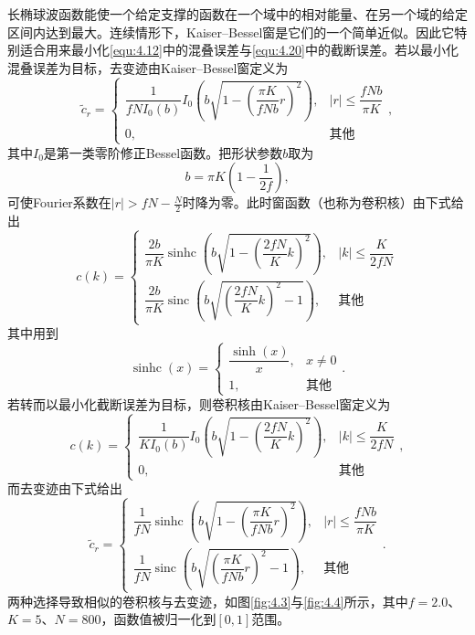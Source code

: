 \documentclass[12pt]{article}
\let\originallautoref\autoref
\renewcommand{\autoref}[1]{\allowbreak\originallautoref{#1}}
\begin{document}
长椭球波函数能使一个给定支撑的函数在一个域中的相对能量、在另一个域的给定区间内达到最大。连续情形下，Kaiser--Bessel窗是它们的一个简单近似。因此它特别适合用来最小化\autoref{equ:4.12}中的混叠误差与\autoref{equ:4.20}中的截断误差。若以最小化混叠误差为目标，去变迹由Kaiser--Bessel窗定义为
\begin{equation}
    \tilde{c}_r=\begin{cases}
        \dfrac{1}{fNI_0(b)}I_0\left(b\sqrt{1-\left(\dfrac{\pi K}{fNb}r\right)^2}\right), & |r|\le\dfrac{fNb}{\pi K}\\[3mm]
        0, & \text{其他}
    \end{cases},
    \label{equ:4.21}
\end{equation}
其中$I_0$是第一类零阶修正Bessel函数。把形状参数$b$取为
\begin{equation}
    b=\pi K\left(1-\frac{1}{2f}\right),
    \label{equ:4.22}
\end{equation}
可使Fourier系数在$|r|>fN-\frac{N}{2}$时降为零。此时窗函数（也称为卷积核）由下式给出
\begin{equation}
    c(k)=\begin{cases}
        \dfrac{2b}{\pi K}\operatorname{sinhc}\left(b\sqrt{1-\left(\dfrac{2fN}{K}k\right)^2}\right), & |k|\le\dfrac{K}{2fN}\\[3mm]
        \dfrac{2b}{\pi K}\operatorname{sinc}\left(b\sqrt{\left(\dfrac{2fN}{K}k\right)^2-1}\right), & \text{其他}
    \end{cases}
    \label{equ:4.23}
\end{equation}
其中用到
\begin{equation}
    \operatorname{sinhc}(x)=\begin{cases}
        \dfrac{\sinh(x)}{x}, & x\neq 0\\[2mm]
        1, & \text{其他}
    \end{cases}.
    \label{equ:4.24}
\end{equation}
若转而以最小化截断误差为目标，则卷积核由Kaiser--Bessel窗定义为
\begin{equation}
    c(k)=\begin{cases}
        \dfrac{1}{KI_0(b)}I_0\left(b\sqrt{1-\left(\dfrac{2fN}{K}k\right)^2}\right), & |k|\le\dfrac{K}{2fN}\\[3mm]
        0, & \text{其他}
    \end{cases},
    \label{equ:4.25}
\end{equation}
而去变迹由下式给出
\begin{equation}
    \tilde{c}_r=\begin{cases}
        \dfrac{1}{fN}\operatorname{sinhc}\left(b\sqrt{1-\left(\dfrac{\pi K}{fNb}r\right)^2}\right), & |r|\le\dfrac{fNb}{\pi K}\\[3mm]
        \dfrac{1}{fN}\operatorname{sinc}\left(b\sqrt{\left(\dfrac{\pi K}{fNb}r\right)^2-1}\right), & \text{其他}
    \end{cases}.
    \label{equ:4.26}
\end{equation}
两种选择导致相似的卷积核与去变迹，如图\autoref{fig:4.3}与\autoref{fig:4.4}所示，其中$f=2.0$、$K=5$、$N=800$，函数值被归一化到$[0,1]$范围。
\end{document}
